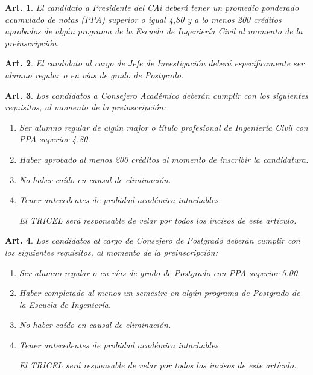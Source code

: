 \documentclass[letterpaper,11pt]{article}
\theoremstyle{plain}
\newtheorem{art}{Art.} %
\begin{document}
		\begin{art}\label{requisitosPresidente}
			El candidato a Presidente del CAi deberá tener un promedio ponderado acumulado de notas (PPA) superior o igual 4,80 y a lo menos 200 créditos aprobados de algún programa de la Escuela de Ingeniería Civil al momento de la preinscripción.
		\end{art}

		\begin{art}\label{requisitosJefeInvestigacion}
			El candidato al cargo de Jefe de Investigación deberá específicamente ser alumno regular o en vías de grado de Postgrado.
		\end{art}

		\begin{art}\label{requisitosCAPregrado}
			Los candidatos a Consejero Académico deberán cumplir con los siguientes requisitos, al momento de la preinscripción:
			\begin{enumerate}
				\item Ser alumno regular de algún major o título profesional de Ingeniería Civil con PPA superior 4.80.
				\item Haber aprobado al menos 200 créditos al momento de inscribir la candidatura.
				\item No haber caído en causal de eliminación.
				\item Tener antecedentes de probidad académica intachables. 


				El TRICEL será responsable de velar por todos los incisos de este artículo.
			\end{enumerate}
		\end{art}

		\begin{art}\label{requisitosCAPostegrado}
			Los candidatos al cargo de Consejero de Postgrado deberán cumplir con los siguientes requisitos, al momento de la preinscripción:
			\begin{enumerate}
				\item Ser alumno regular o en vías de grado de Postgrado con PPA superior 5.00.
				\item Haber completado al menos un semestre en algún programa de Postgrado de la Escuela de Ingeniería.
				\item No haber caído en causal de eliminación.
				\item Tener antecedentes de probidad académica intachables. 

				El TRICEL será responsable de velar por todos los incisos de este artículo.
			\end{enumerate}
		\end{art}
\end{document}
